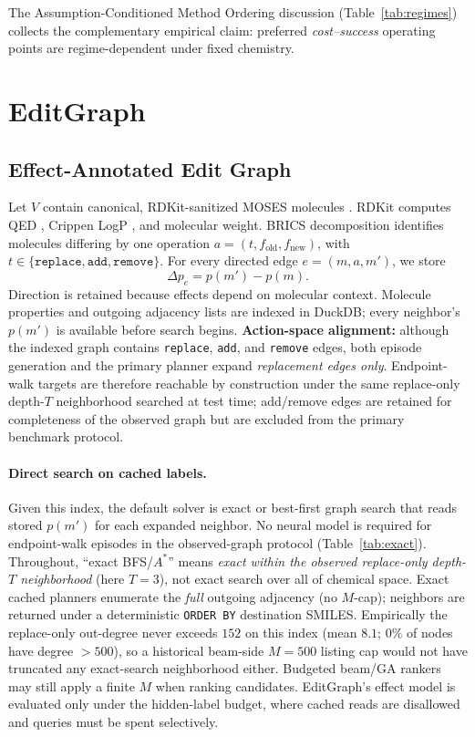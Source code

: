 \documentclass[journal=jcisd8,manuscript=article,email=false]{achemso}
\begin{document}
The Assumption-Conditioned Method Ordering discussion (Table~\ref{tab:regimes}) collects the complementary empirical claim: preferred \emph{cost--success} operating points are regime-dependent under fixed chemistry.

\section{EditGraph}
\label{sec:method}

\subsection{Effect-Annotated Edit Graph}

Let $V$ contain canonical, RDKit-sanitized MOSES molecules \citep{polykovskiy2020moses}. RDKit computes QED \citep{bickerton2012qed}, Crippen LogP \citep{wildman1999crippen}, and molecular weight. BRICS decomposition \citep{degen2008brics} identifies molecules differing by one operation
$a=(t,f_{\mathrm{old}},f_{\mathrm{new}})$, with
$t\in\{\texttt{replace},\texttt{add},\texttt{remove}\}$.
For every directed edge $e=(m,a,m')$, we store
\[
\Delta p_e=p(m')-p(m).
\]
Direction is retained because effects depend on molecular context. Molecule properties and outgoing adjacency lists are indexed in DuckDB; every neighbor's $p(m')$ is available before search begins. \textbf{Action-space alignment:} although the indexed graph contains \texttt{replace}, \texttt{add}, and \texttt{remove} edges, both episode generation and the primary planner expand \emph{replacement edges only}. Endpoint-walk targets are therefore reachable by construction under the same replace-only depth-$T$ neighborhood searched at test time; add/remove edges are retained for completeness of the observed graph but are excluded from the primary benchmark protocol.

\paragraph{Direct search on cached labels.}
Given this index, the default solver is exact or best-first graph search that reads stored $p(m')$ for each expanded neighbor. No neural model is required for endpoint-walk episodes in the observed-graph protocol (Table~\ref{tab:exact}). Throughout, ``exact BFS/$A^\ast$'' means \emph{exact within the observed replace-only depth-$T$ neighborhood} (here $T{=}3$), not exact search over all of chemical space. Exact cached planners enumerate the \emph{full} outgoing adjacency (no $M$-cap); neighbors are returned under a deterministic \texttt{ORDER BY} destination SMILES. Empirically the replace-only out-degree never exceeds $152$ on this index (mean $8.1$; $0\%$ of nodes have degree ${>}500$), so a historical beam-side $M{=}500$ listing cap would not have truncated any exact-search neighborhood either. Budgeted beam/GA rankers may still apply a finite $M$ when ranking candidates. EditGraph's effect model is evaluated only under the hidden-label budget, where cached reads are disallowed and queries must be spent selectively.
\end{document}
